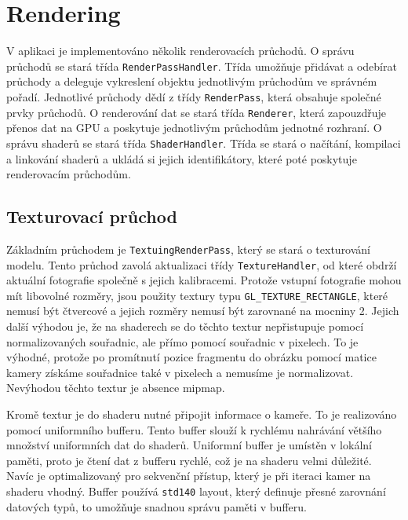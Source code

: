 \documentclass[11pt,twoside,a4paper]{book}
\begin{document}
\newpage
\section{Rendering}

V aplikaci je implementováno několik renderovacích průchodů. O správu průchodů se stará třída \texttt{RenderPassHandler}. Třída umožňuje přidávat a odebírat průchody a deleguje vykreslení objektu jednotlivým průchodům ve správném pořadí. Jednotlivé průchody dědí z třídy \texttt{RenderPass}, která obsahuje společné prvky průchodů. O renderování dat se stará třída \texttt{Renderer}, která zapouzdřuje přenos dat na GPU a poskytuje jednotlivým průchodům jednotné rozhraní. O správu shaderů se stará třída \texttt{ShaderHandler}. Třída se stará o načítání, kompilaci a linkování shaderů a ukládá si jejich identifikátory, které poté poskytuje renderovacím průchodům.

\subsection{Texturovací průchod}

Základním průchodem je \texttt{TextuingRenderPass}, který se stará o texturování modelu. Tento průchod zavolá aktualizaci třídy \texttt{TextureHandler}, od které obdrží aktuální fotografie společně s jejich kalibracemi. Protože vstupní fotografie mohou mít libovolné rozměry, jsou použity textury typu \verb|GL_TEXTURE_RECTANGLE|, které nemusí být čtvercové a jejich rozměry nemusí být zarovnané na mocniny 2. Jejich další výhodou je, že na shaderech se do těchto textur nepřistupuje pomocí normalizovaných souřadnic, ale přímo pomocí souřadnic v pixelech. To je výhodné, protože po promítnutí pozice fragmentu do obrázku pomocí matice kamery získáme souřadnice také v pixelech a nemusíme je normalizovat. Nevýhodou těchto textur je absence mipmap.

Kromě textur je do shaderu nutné připojit informace o kameře. To je realizováno pomocí uniformního bufferu. Tento buffer slouží k rychlému nahrávání většího množství uniformních dat do shaderů. Uniformní buffer je umístěn v lokální paměti, proto je čtení dat z bufferu rychlé, což je na shaderu velmi důležité. Navíc je optimalizovaný pro sekvenční přístup, který je při iteraci kamer na shaderu vhodný. Buffer používá \texttt{std140} layout, který definuje přesné zarovnání datových typů, to umožňuje snadnou správu paměti v bufferu.
\end{document}
